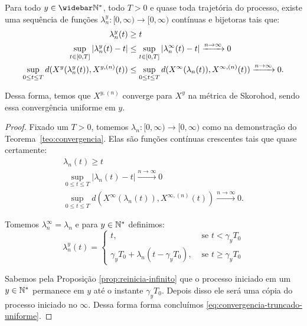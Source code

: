 \begin{corolario}
  \label{cor:convergencia}
  Para todo $y \in \Nzb$, todo $T > 0$ e quase toda trajetória do
  processo, existe uma sequência de funções $\lambda^y_n: [0, \infty) \to
  [0, \infty)$ contínuas e bijetoras tais que:
  \begin{align}
    \lambda^y_n(t) &\geq t \notag\\
    \label{eq:convergencia-truncado-uniforme}
    \sup_{t \in [0, T]} |\lambda^y_n(t) - t| &\leq
    \sup_{t \in [0, T]} |\lambda^\infty_n(t) - t|
    \xrightarrow{n \to \infty} 0\\
    \sup_{0 \leq t \leq T} d(X^y(\lambda_n^y(t)), X^{y, (n)}(t)) &\leq
    \sup_{0 \leq t \leq T} d(X^\infty(\lambda_n(t)), X^{\infty, (n)}(t))
    \xrightarrow{n\to\infty} 0. \notag
  \end{align}

  Dessa forma, temos que $X^{y, (n)}$ converge \qc para $X^y$ na
  métrica de Skorohod, sendo essa convergência uniforme em $y$.
\end{corolario}
\begin{proof}
  Fixado um $T > 0$, tomemos $\lambda_n: [0, \infty) \to [0, \infty)$
  como na demonstração do \mbox{Teorema \ref{teo:convergencia}}. Elas
  são funções contínuas crescentes tais que quase certamente:
  \begin{gather*}
    \lambda_n(t) \geq t\\
    \sup_{0 \leq t \leq T} |\lambda_n(t) - t|
    \xrightarrow{n\to\infty} 0 \\
    \sup_{0 \leq t \leq T} d(X^\infty(\lambda_n(t)), X^{\infty, (n)}(t))
    \xrightarrow{n\to\infty} 0.
  \end{gather*}

  Tomemos $\lambda^\infty_n = \lambda_n$ e para $y \in {\mathbb{N^*}}$ definimos:
  \begin{displaymath}
    \lambda_n^y(t) = \begin{cases}
      t, & \textrm{ se } t < \gamma_y T_0\\
      \gamma_yT_0 + \lambda_n(t - \gamma_y T_0),
      & \textrm{ se } t \geq \gamma_y T_0
    \end{cases}
  \end{displaymath}


  Sabemos pela Proposição \ref{prop:reinicia-infinito} que o processo
  iniciado em um $y \in {\mathbb{N^*}}$ permanece em $y$ até o instante $\gamma_y
  T_0$. Depois disso ele será uma cópia do processo iniciado no
  $\infty$. Dessa forma forma concluímos
  \eqref{eq:convergencia-truncado-uniforme}.
\end{proof}


